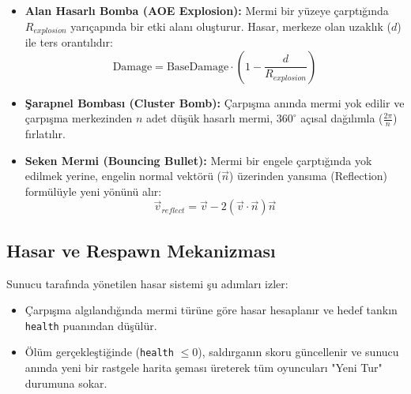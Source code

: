 \documentclass[12pt,a4paper]{article}
\begin{document}
\begin{itemize}
      \item \textbf{Alan Hasarlı Bomba (AOE Explosion):} Mermi bir yüzeye çarptığında $R_{explosion}$ yarıçapında bir etki alanı oluşturur. Hasar, merkeze olan uzaklık ($d$) ile ters orantılıdır:
            \[ \text{Damage} = \text{BaseDamage} \cdot (1 - \frac{d}{R_{explosion}}) \]
      \item \textbf{Şarapnel Bombası (Cluster Bomb):} Çarpışma anında mermi yok edilir ve çarpışma merkezinden $n$ adet düşük hasarlı mermi, $360^{\circ}$ açısal dağılımla ($\frac{2\pi}{n}$) fırlatılır.
      \item \textbf{Seken Mermi (Bouncing Bullet):} Mermi bir engele çarptığında yok edilmek yerine, engelin normal vektörü ($\vec{n}$) üzerinden yansıma (Reflection) formülüyle yeni yönünü alır:
            \[ \vec{v}_{reflect} = \vec{v} - 2(\vec{v} \cdot \vec{n})\vec{n} \]
\end{itemize}

\subsection{Hasar ve Respawn Mekanizması}
Sunucu tarafında yönetilen hasar sistemi şu adımları izler:
\begin{itemize}
      \item Çarpışma algılandığında mermi türüne göre hasar hesaplanır ve hedef tankın \texttt{health} puanından düşülür.
      \item Ölüm gerçekleştiğinde (\texttt{health} $\leq 0$), saldırganın skoru güncellenir ve sunucu anında yeni bir rastgele harita şeması üreterek tüm oyuncuları "Yeni Tur" durumuna sokar.
\end{itemize}
\end{document}
